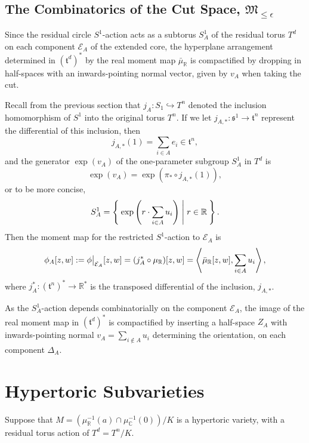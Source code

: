 \documentclass{article}
\newcommand{\ra}{\rightarrow}
\newcommand{\lbracket}{\left(}
\newcommand{\rbracket}{\right)}
\newcommand{\e}{\epsilon}
\newcommand{\RR}{\mathbb{R}}
\newcommand{\CC}{\mathbb{C}}
\newcommand{\mcE}{\mathcal{E}}
\newcommand{\mft}{\mathfrak{t}}
\newcommand{\mc}[1]{\mathcal{#1}}
\newcommand{\mf}[1]{\mathfrak{#1}}
\newcommand{\mrr}{\mu_{\mathbb{R}}}
\newcommand\restr[2]{{%
		\left.\kern-\nulldelimiterspace %
		#1 %
		\vphantom{\big|} %
		\right|_{#2} %
}}
\begin{document}
	\subsection{The Combinatorics of the Cut Space, $\mf{M}_{\leq \e}$}
	
	Since the residual circle $S^{1}$-action acts as a subtorus $S_{A}^{1}$ of the residual torus $T^{d}$ on each component $\mc{E}_{A}$ of the extended core, the hyperplane arrangement determined in $(\mft^{d})^{\ast}$ by the real moment map $\bar{\mu}_{\RR}$ is compactified by dropping in half-spaces with an inwards-pointing normal vector, given by $v_{A}$ when taking the cut. 
	
	Recall from the previous section that $j_{A}: S_{1} \hookrightarrow T^{n}$ denoted the inclusion homomorphism of $S^{1}$ into the original torus $T^{n}$. If we let $j_{A, \ast}: \mf{s}^{1} \rightarrow \mft^{n}$ represent the differential of this inclusion, then
	\[
		j_{A,\ast}(1) = \sum_{i \in A} e_{i} \in \mft^{n},
	\]
	and the generator $\exp(v_{A})$ of the one-parameter subgroup $S_{A}^{1}$ in $T^{d}$ is
	\[
		\exp(v_{A}) = \exp\lbracket \pi_{\ast} \circ j_{A, \ast}(1) \rbracket,
	\]
	or to be more concise,
	\[
		S_{A}^{1} = \Set{ \exp \lbracket r \cdot \sum_{i \in A} u_{i} \rbracket | r \in \RR }.
	\]
	Then the moment map for the restricted $S^{1}$-action to $\mcE_{A}$ is
	\begin{equation*}
		\phi_{A}[z,w] := \restr{\phi}{\mcE_{A}} [z,w] =  (j_{A}^{\ast} \circ \mrr)[z,w] = \left\langle \bar{\mu}_{\RR}[z,w], \sum_{i\in A} u_{i} \right\rangle,
	\end{equation*}
	where $j_{A}^{\ast} : (\mft^{n})^{\ast} \ra \RR^{\ast}$ is the transposed differential of the inclusion, $j_{A, \ast}$.
	
	As the $S_{A}^{1}$-action depends combinatorially on the component $\mcE_{A}$, the image of the real moment map in $(\mft^{d})^{\ast}$ is compactified by inserting a half-space $Z_{A}$ with inwards-pointing normal $v_{A} = \sum_{i \not\in A}u_{i}$ determining the orientation, on each component $\Delta_{A}$.
	
	\section{Hypertoric Subvarieties}
	
	Suppose that $M = \left(\mu_{\RR}^{-1}(a) \cap \mu_{\CC}^{-1}(0)\right) / K$ is a hypertoric variety, with a residual torus action of $T^{d} = T^{n}/K$.

	
\end{document}
